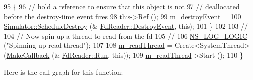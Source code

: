 \begin{DoxyCode}
95     \{
96       \textcolor{comment}{// hold a reference to ensure that this object is not}
97       \textcolor{comment}{// deallocated before the destroy-time event fires}
98       this->\hyperlink{classns3_1_1SimpleRefCount_ab7545a4e56ceef44cb91e2bbf0f26f18}{Ref} ();
99       \hyperlink{classns3_1_1FdReader_a9f3cee67eb1d43aa53ebc23384e32828}{m\_destroyEvent} =
100         \hyperlink{classns3_1_1Simulator_a7e1c6479e6d0bd3f0eb3e005d6941302}{Simulator::ScheduleDestroy} (&
      \hyperlink{classns3_1_1FdReader_a7de041cbd9bfab170576ddd6fa83eea9}{FdReader::DestroyEvent}, \textcolor{keyword}{this});
101     \}
102 
103   \textcolor{comment}{//}
104   \textcolor{comment}{// Now spin up a thread to read from the fd}
105   \textcolor{comment}{//}
106   \hyperlink{group__logging_ga88acd260151caf2db9c0fc84997f45ce}{NS\_LOG\_LOGIC} (\textcolor{stringliteral}{"Spinning up read thread"});
107 
108   \hyperlink{classns3_1_1FdReader_ae610be5a8e8c8e72620fe131f3277cd6}{m\_readThread} = Create<SystemThread> (\hyperlink{group__makecallbackmemptr_ga9376283685aa99d204048d6a4b7610a4}{MakeCallback} (&
      \hyperlink{classns3_1_1FdReader_abac0b41fc484fbc47c37a14174bddb03}{FdReader::Run}, \textcolor{keyword}{this}));
109   \hyperlink{classns3_1_1FdReader_ae610be5a8e8c8e72620fe131f3277cd6}{m\_readThread}->Start ();
110 \}
\end{DoxyCode}


Here is the call graph for this function\+:


